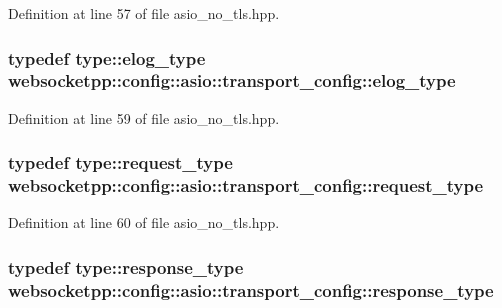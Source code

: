 Definition at line 57 of file asio\+\_\+no\+\_\+tls.\+hpp.

\hypertarget{structwebsocketpp_1_1config_1_1asio_1_1transport__config_a269e16af2262a7b1a9165e488b2dc651}{}
\subsubsection[{elog\+\_\+type}]{\setlength{\rightskip}{0pt plus 5cm}typedef {\bf type\+::elog\+\_\+type} {\bf websocketpp\+::config\+::asio\+::transport\+\_\+config\+::elog\+\_\+type}}\label{structwebsocketpp_1_1config_1_1asio_1_1transport__config_a269e16af2262a7b1a9165e488b2dc651}


Definition at line 59 of file asio\+\_\+no\+\_\+tls.\+hpp.

\hypertarget{structwebsocketpp_1_1config_1_1asio_1_1transport__config_a5bd4b592ae10c2c5df22cf894c3db62b}{}
\subsubsection[{request\+\_\+type}]{\setlength{\rightskip}{0pt plus 5cm}typedef {\bf type\+::request\+\_\+type} {\bf websocketpp\+::config\+::asio\+::transport\+\_\+config\+::request\+\_\+type}}\label{structwebsocketpp_1_1config_1_1asio_1_1transport__config_a5bd4b592ae10c2c5df22cf894c3db62b}


Definition at line 60 of file asio\+\_\+no\+\_\+tls.\+hpp.

\hypertarget{structwebsocketpp_1_1config_1_1asio_1_1transport__config_ac6bbac6039c4723a7a59892b77437697}{}
\subsubsection[{response\+\_\+type}]{\setlength{\rightskip}{0pt plus 5cm}typedef {\bf type\+::response\+\_\+type} {\bf websocketpp\+::config\+::asio\+::transport\+\_\+config\+::response\+\_\+type}}\label{structwebsocketpp_1_1config_1_1asio_1_1transport__config_ac6bbac6039c4723a7a59892b77437697}


